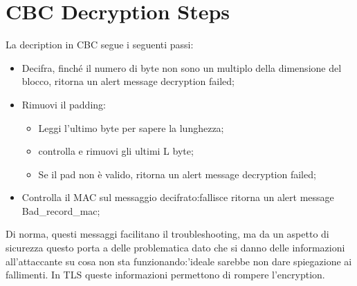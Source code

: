 \documentclass{book}
\theoremstyle{remark}
\begin{document}
\section{CBC Decryption Steps}
La decription in CBC segue i seguenti passi:\begin{itemize}
	\item Decifra, finché il numero di byte non sono un multiplo della dimensione del blocco, ritorna un alert message decryption failed;\@
	\item Rimuovi il padding:\begin{itemize}
		      \item Leggi l'ultimo byte per sapere la lunghezza;\@
		      \item controlla e rimuovi gli ultimi L byte;\@
		      \item Se il pad non è valido, ritorna un alert message decryption failed;\@
	      \end{itemize}
	\item Controlla il MAC sul messaggio decifrato:\@se fallisce ritorna un alert message Bad\_record\_mac;\@
\end{itemize}
Di norma, questi messaggi facilitano il troubleshooting, ma da un aspetto di sicurezza questo porta a delle problematica dato che si danno delle informazioni all'attaccante su cosa non sta funzionando:\@l'ideale sarebbe non dare spiegazione ai fallimenti\@.\newline
In TLS queste informazioni permettono di rompere l'encryption\@.
\end{document}

